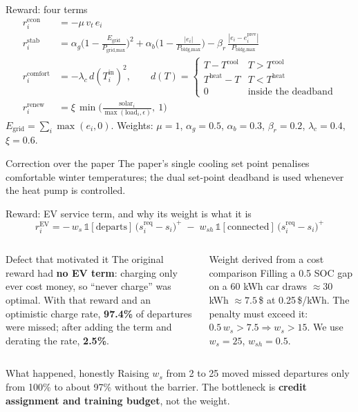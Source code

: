 \documentclass[aspectratio=169,10pt]{beamer}
\begin{document}
\begin{frame}{Reward: four terms}
\begin{align*}
r^{\text{econ}}_i &= -\mu\, v_t\, e_i\\
r^{\text{stab}}_i &= \alpha_g\Big(1 - \tfrac{E_{\text{grid}}}{P_{\text{grid,max}}}\Big)^2 + \alpha_b\Big(1 - \tfrac{|e_i|}{P_{\text{bldg,max}}}\Big) - \beta_r\,\tfrac{|e_i - e_i^{\text{prev}}|}{P_{\text{bldg,max}}}\\
r^{\text{comfort}}_i &= -\lambda_c\, d(T^{\text{in}}_i)^2,
\qquad
d(T) = \begin{cases} T - T^{\text{cool}} & T > T^{\text{cool}}\\ T^{\text{heat}} - T & T < T^{\text{heat}}\\ 0 & \text{inside the deadband}\end{cases}\\
r^{\text{renew}}_i &= \xi\,\min\Big(\tfrac{\text{solar}_i}{\max(\text{load}_i,\epsilon)},\ 1\Big)
\end{align*}
\small $E_{\text{grid}} = \sum_i \max(e_i,0)$. Weights: $\mu = 1$, $\alpha_g = 0.5$, $\alpha_b = 0.3$, $\beta_r = 0.2$, $\lambda_c = 0.4$, $\xi = 0.6$.
\begin{block}{Correction over the paper}
The paper's single cooling set point penalises comfortable winter temperatures; the dual set-point deadband is used whenever the heat pump is controlled.
\end{block}
\end{frame}

\begin{frame}{Reward: EV service term, and why its weight is what it is}
\[
r^{\text{EV}}_i = -\,w_s\,\mathbb 1[\text{departs}]\,\big(s^{\text{req}}_i - s_i\big)^+ \;-\; w_{sh}\,\mathbb 1[\text{connected}]\,\big(s^{\text{req}}_i - s_i\big)^+
\]
\begin{columns}[T]
\begin{alertblock}{Defect that motivated it}
The original reward had \textbf{no EV term}: charging only ever cost money, so ``never charge'' was optimal. With that reward and an optimistic charge rate, \textbf{97.4\%} of departures were missed; after adding the term and derating the rate, \textbf{2.5\%}.
\end{alertblock}
\begin{block}{Weight derived from a cost comparison}
Filling a 0.5 SOC gap on a 60 kWh car draws $\approx 30$ kWh $\approx 7.5$\,\$ at 0.25\,\$/kWh. The penalty must exceed it: $0.5\,w_s > 7.5 \Rightarrow w_s > 15$. We use $w_s = 25$, $w_{sh} = 0.5$.
\end{block}
\end{columns}
\vspace{0.4em}
\begin{alertblock}{What happened, honestly}
Raising $w_s$ from 2 to 25 moved missed departures only from 100\% to about 97\% without the barrier. The bottleneck is \textbf{credit assignment and training budget}, not the weight.
\end{alertblock}
\end{frame}
\end{document}

